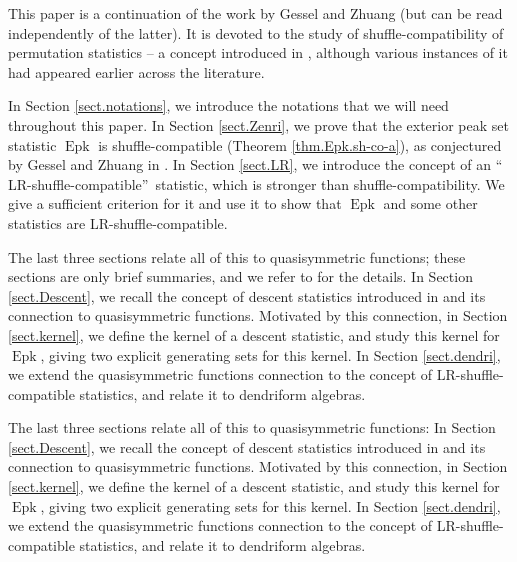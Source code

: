 \documentclass[numbers=enddot,12pt,final,onecolumn,notitlepage]{scrartcl}%
\theoremstyle{definition}
\newenvironment{verlong}{}{}
\newenvironment{vershort}{}{}
\begin{document}
This paper is a continuation of the work \cite{part1} by Gessel and Zhuang
(but can be read independently of the latter). It is devoted to the study of
shuffle-compatibility of permutation statistics -- a concept introduced in
\cite{part1}, although various instances of it had appeared earlier across
the literature.

In Section \ref{sect.notations}, we introduce the notations that we will need
throughout this paper. In Section \ref{sect.Zenri}, we prove that the exterior
peak set statistic $\operatorname{Epk}$ is shuffle-compatible (Theorem
\ref{thm.Epk.sh-co-a}), as conjectured by Gessel and Zhuang in \cite{part1}.
In Section \ref{sect.LR}, we introduce the concept of an \textquotedblleft
LR-shuffle-compatible\textquotedblright\ statistic, which is stronger than
shuffle-compatibility. We give a sufficient criterion for it and use it to
show that $\operatorname{Epk}$ and some other statistics are
LR-shuffle-compatible.

\begin{vershort}
The last three sections relate all of this to quasisymmetric functions; these
sections are only brief summaries, and we refer to \cite{verlong} for the
details. In Section \ref{sect.Descent}, we recall the concept of descent
statistics introduced in \cite{part1} and its connection to quasisymmetric
functions. Motivated by this connection, in Section \ref{sect.kernel}, we
define the kernel of a descent statistic, and study this kernel for
$\operatorname{Epk}$, giving two explicit generating sets for this kernel. In
Section \ref{sect.dendri}, we extend the quasisymmetric functions connection
to the concept of LR-shuffle-compatible statistics, and relate it to
dendriform algebras.
\end{vershort}

\begin{verlong}
The last three sections relate all of this to quasisymmetric functions: In
Section \ref{sect.Descent}, we recall the concept of descent statistics
introduced in \cite{part1} and its connection to quasisymmetric functions.
Motivated by this connection, in Section \ref{sect.kernel}, we define the
kernel of a descent statistic, and study this kernel for
$\operatorname{Epk}$, giving two explicit generating sets for this kernel.
In Section \ref{sect.dendri},
we extend the quasisymmetric functions connection to the
concept of LR-shuffle-compatible statistics, and relate it to dendriform algebras.
\end{verlong}
\end{document}
